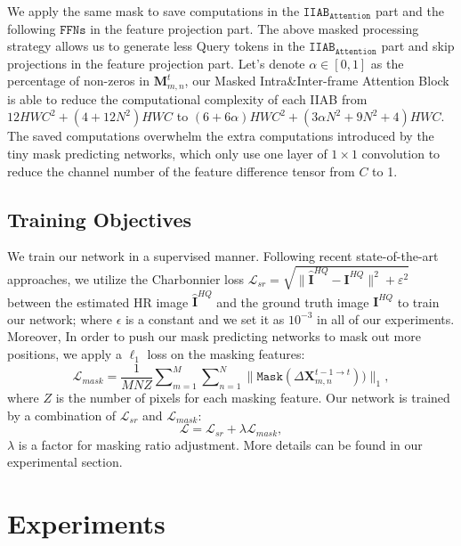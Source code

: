 \documentclass[10pt,twocolumn,letterpaper]{article}
\begin{document}
We apply the same mask to save computations in the $\texttt{IIAB}_\texttt{Attention}$ part and the following $\texttt{FFNs}$ in the feature projection part.
%
The above masked processing strategy allows us to generate less Query tokens in the $\texttt{IIAB}_\texttt{Attention}$ part and skip projections in the feature projection part.
%
Let's denote $\alpha\in[0,1]$ as the percentage of
non-zeros in $\bm{M}_{m,n}^t$, our Masked Intra\&Inter-frame Attention Block is able to reduce the computational complexity of each IIAB from $12HWC^2+(4+12N^2)HWC$ to $(6+6\alpha)HWC^2+(3\alpha N^2+9N^2+4)HWC$.
%
The saved computations overwhelm the extra computations introduced by the tiny mask predicting networks, which only use one layer of $1 \times 1$ convolution to reduce the channel number of the feature difference tensor from $C$ to 1. 
%
\subsection{Training Objectives}
We train our network in a supervised manner.
%
Following recent state-of-the-art approaches, we utilize the
Charbonnier loss \cite{charbonnier1994two} $\mathcal{L}_{sr} = \sqrt{\parallel\bm{\hat{I}}^{HQ} -\bm{I}^{HQ} \parallel^2 + \varepsilon ^2}$ between the estimated HR image $\bm{\hat{I}}^{HQ}$ and the ground truth image $\bm{I}^{HQ}$ to train our network; 
where $\epsilon$ is a constant and we set it as $10^{-3}$ in all of our experiments.
%
Moreover, In order to push our mask predicting networks to mask out more positions, we apply a $\ell_1$ loss on the masking features:
\begin{equation}
     \mathcal{L}_{mask} = \frac{1}{MNZ}\sum\nolimits_{m = 1}^{M}\sum\nolimits_{n = 1}^{N}\|\texttt{Mask}(\Delta \bm{X}_{m,n}^{t-1\to t}))\|_1,
\end{equation}
where $Z$ is the number of pixels for each masking feature.
%
Our network is trained by a combination of $\mathcal{L}_{sr}$ and $\mathcal{L}_{mask}$:
\begin{equation}\label{eq:loss}
     \mathcal{L} = \mathcal{L}_{sr}+\lambda\mathcal{L}_{mask},
\end{equation}
 $\lambda$ is a factor for masking ratio adjustment.
%
More details can be found in our experimental section.
\section{Experiments}
\end{document}
